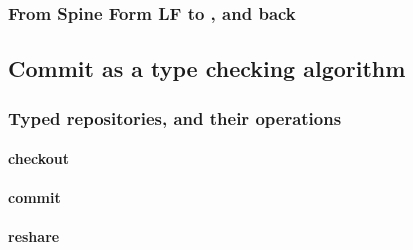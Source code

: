 \documentclass[9pt,authoryear]{sigplanconf}
\begin{document}
\subsubsection{From Spine Form LF to {\system}, and back}






\subsection{Commit as a type checking algorithm}



\subsubsection{Typed repositories, and their operations}

\paragraph{checkout}

\paragraph{commit}


\paragraph{reshare}
\end{document}
